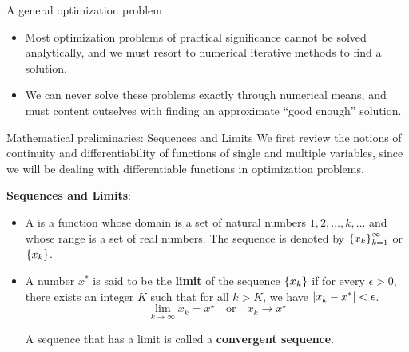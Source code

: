\documentclass[aspectratio=169]{beamer}
\let\olditem\item
\renewcommand{\item}{\setlength{\itemsep}{\fill}\olditem}
\def\lv{\ensuremath\left\lvert}
\def\rv{\ensuremath\right\rvert}
\def\lc{\ensuremath\left\{}
\def\rc{\ensuremath\right\}}
\begin{document}
\begin{frame}[t]{A general optimization problem}
\begin{itemize}
  \item Most optimization problems of practical significance cannot be solved analytically, and we must resort to numerical iterative methods to find a solution.
  
  \item We can never solve these problems exactly through numerical means, and must content outselves with finding an approximate ``good enough'' solution.
\end{itemize}
\end{frame}


\begin{frame}[t]{Mathematical preliminaries: Sequences and Limits}
  We first review the notions of continuity and differentiability of functions of single and multiple variables, since we will be dealing with differentiable functions in optimization problems.
  \vspace{0.2cm}

  \textbf{Sequences and Limits}:
  \begin{itemize}
    \item A  is a function whose domain is a set of natural numbers $1, 2, \ldots, k, \ldots$ and whose range is a set of real numbers. The sequence is denoted by $\lc x_k\rc_{k=1}^{\infty}$ or $\lc x_k \rc$.
    \vspace{0.25cm}
  
    \item A number $x^{*}$ is said to be the \textbf{limit} of the sequence $\lc x_k \rc$ if for every $\epsilon > 0$, there exists an integer $K$ such that for all $k > K$, we have $\lv x_k - x^{*} \rv < \epsilon$.
    \[ \lim_{k \to \infty} x_k = x^{\star} \quad \mathrm{or} \quad x_k \to x^{\star} \]

    A sequence that has a limit is called a \textbf{convergent sequence}.
  \end{itemize}
\end{frame}
\end{document}
